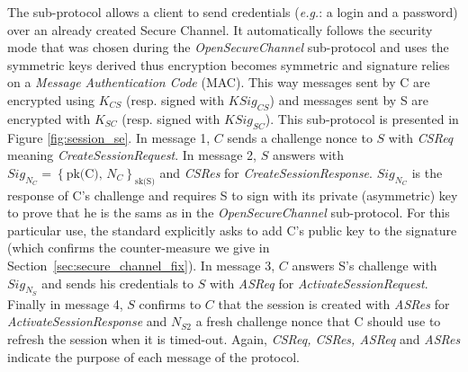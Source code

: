 \newcommand{\csreq}{CSReq}
\newcommand{\csres}{CSRes}
\newcommand{\asreq}{ASReq}
\newcommand{\asres}{ASRes}

The  sub-protocol allows a client to send
credentials (\emph{e.g.}: a login and a password) over an already
created Secure Channel.  It automatically follows the security mode
that was chosen during the {\em OpenSecureChannel} sub-protocol and
uses the symmetric keys derived thus encryption becomes symmetric and
signature relies on a \emph{Message Authentication Code} (MAC).  This
way messages sent by C are encrypted using $K_{CS}$ (resp. signed with
$KSig_{CS}$) and messages sent by S are encrypted with $K_{SC}$
(resp. signed with $KSig_{SC}$).  This sub-protocol is presented in
Figure \ref{fig:session_se}.  In message 1, $C$ sends a challenge
nonce to $S$ with {\em CSReq} meaning {\em CreateSessionRequest}.  In
message 2, $S$ answers with $Sig_{N_{C}} = \left\{\mbox{pk(C),
  $N_{C}$}\right\}_{\mbox{sk(S)}}$ and {\em CSRes} for {\em
  CreateSessionResponse}.  $Sig_{N_{C}}$ is the response of C's
challenge and requires S to sign with its private (asymmetric) key to
prove that he is the sams as in the {\em OpenSecureChannel}
sub-protocol.  For this particular use, the \opcua standard explicitly
asks to add C's public key to the signature (which confirms the
counter-measure we give in Section~\ref{sec:secure_channel_fix}).  In
message 3, $C$ answers S's challenge with $Sig_{N_{S}}$ and sends his
credentials to $S$ with {\em ASReq} for {\em ActivateSessionRequest}.
Finally in message 4, $S$ confirms to $C$ that the session is created
with {\em ASRes} for {\em ActivateSessionResponse} and $N_{S2}$ a
fresh challenge nonce that C should use to refresh the session when it
is timed-out.  Again, {\em CSReq, CSRes, ASReq} and {\em ASRes}
indicate the purpose of each message of the protocol.

